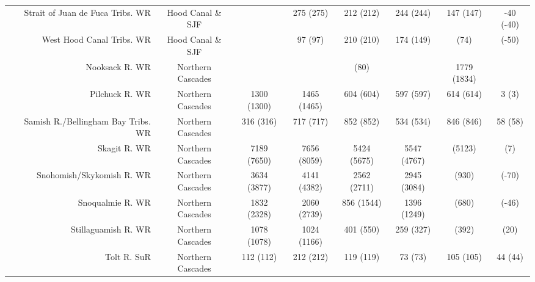 \documentclass[]{article}
\begin{document}
\begin{landscape}
\begin{table}[p]
\begin{tabular}{r|c|cccccc}
  Strait of Juan de Fuca Tribs. WR & Hood Canal \& SJF &  & 275 (275) & 212 (212) & 244 (244) & 147 (147) & -40 (-40) \\ 
  West Hood Canal Tribs. WR & Hood Canal \& SJF &  & 97 (97) & 210 (210) & 174 (149) &  (74) &  (-50) \\ 
  Nooksack R. WR & Northern Cascades &  &  &  (80) &  & 1779 (1834) &  \\ 
  Pilchuck R. WR & Northern Cascades & 1300 (1300) & 1465 (1465) & 604 (604) & 597 (597) & 614 (614) & 3 (3) \\ 
  Samish R./Bellingham Bay Tribs. WR & Northern Cascades & 316 (316) & 717 (717) & 852 (852) & 534 (534) & 846 (846) & 58 (58) \\ 
  Skagit R. WR & Northern Cascades & 7189 (7650) & 7656 (8059) & 5424 (5675) & 5547 (4767) &  (5123) &  (7) \\ 
  Snohomish/Skykomish R. WR & Northern Cascades & 3634 (3877) & 4141 (4382) & 2562 (2711) & 2945 (3084) &  (930) &  (-70) \\ 
  Snoqualmie R. WR & Northern Cascades & 1832 (2328) & 2060 (2739) & 856 (1544) & 1396 (1249) &  (680) &  (-46) \\ 
  Stillaguamish R. WR & Northern Cascades & 1078 (1078) & 1024 (1166) & 401 (550) & 259 (327) &  (392) &  (20) \\ 
  Tolt R. SuR & Northern Cascades & 112 (112) & 212 (212) & 119 (119) & 73 (73) & 105 (105) & 44 (44) \\ 
   \hline
\end{tabular}
\end{table}
\end{landscape}
\end{document}
